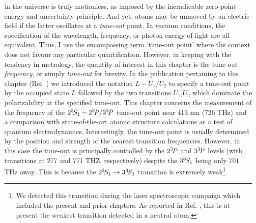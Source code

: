 	 in the universe is truly motionless, as imposed by the ineradicable zero-point energy and uncertainty principle.
	And yet, atoms may be unmoved by an electric field if the latter oscillates at a \emph{tune-out} point.
	In vacuum conditions, the specification of the wavelength, frequency, or photon energy of light are all equivalent. 
	Thus, I use the encompassing term `tune-out point' where the context does not favour any particular quantification.
	However, in keeping with the tendency in metrology, the quantity of interest in this chapter is the tune-out \emph{frequency}, or simply \emph{tune-out} for brevity. 
	In the publication pertaining to this chapter (Ref. \cite{Henson22}) we introduced the notation $L-U_1/U_2$ to specify a tune-out point by the occupied state $L$ followed by the two transitions $U_1$,$U_2$ which dominate the polarizability at the specified tune-out. 
	This chapter concerns the measurement of the frequency of the $2^{3\!}S_1-2^{3\!} P/3^{3\!} P$ tune-out point near 413 nm (726 THz) \cite{Henson15,Mitroy13} and a comparison with state-of-the-art atomic structure calculations as a test of quantum electrodynamics.
	Interestingly, the tune-out point is usually determined by the position and strength of the nearest transition frequencies. 
	However, in this case the tune-out is principally controlled by the $2^{3\!} P$ and $3^{3\!} P$ levels (with transitions at 277 and 771 THZ, respectively) despite the $3 ^{3\!} S_1$ being only $701$ THz away. This is because the  $2^{3\!}S_1 \rightarrow 3^{3\!}S_1 $ transition is extremely weak\footnote{We detected this transition during the laser spectroscopic campaign which included the present and prior chapters. As reported in Ref. \cite{Thomas20}, this is at present the weakest transition detected in a neutral atom.}.

